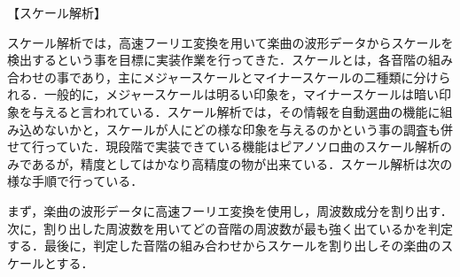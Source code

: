【スケール解析】
\par
スケール解析では，高速フーリエ変換を用いて楽曲の波形データからスケールを検出するという事を目標に実装作業を行ってきた．スケールとは，各音階の組み合わせの事であり，主にメジャースケールとマイナースケールの二種類に分けられる．一般的に，メジャースケールは明るい印象を，マイナースケールは暗い印象を与えると言われている．スケール解析では，その情報を自動選曲の機能に組み込めないかと，スケールが人にどの様な印象を与えるのかという事の調査も併せて行っていた．現段階で実装できている機能はピアノソロ曲のスケール解析のみであるが，精度としてはかなり高精度の物が出来ている．スケール解析は次の様な手順で行っている．\par
まず，楽曲の波形データに高速フーリエ変換を使用し，周波数成分を割り出す．次に，割り出した周波数を用いてどの音階の周波数が最も強く出ているかを判定する．最後に，判定した音階の組み合わせからスケールを割り出しその楽曲のスケールとする．
